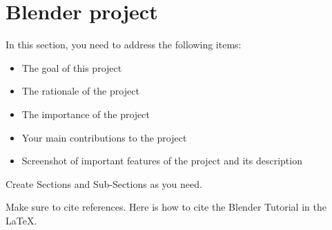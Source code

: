 \section{Blender project}
In this section, you need to address the following items:

\begin{itemize}
\item The goal of this project
\item The rationale of the project 
\item The importance of the project
\item Your main contributions to the project  
\item Screenshot of important features of the project and its description
\end{itemize}

Create Sections and Sub-Sections as you need.

Make sure to cite references. Here is how to cite the Blender Tutorial \cite{blender-foundation} in the LaTeX.